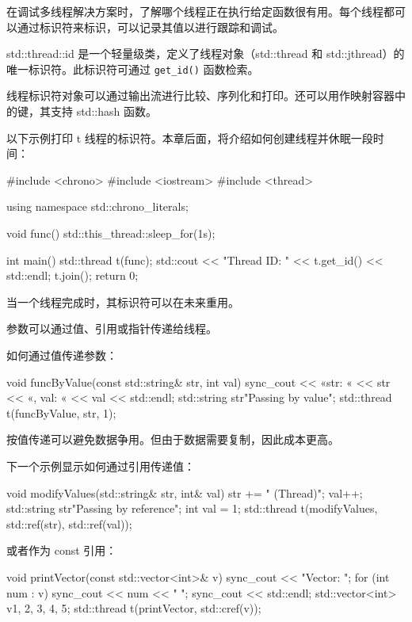 
在调试多线程解决方案时，了解哪个线程正在执行给定函数很有用。每个线程都可以通过标识符来标识，可以记录其值以进行跟踪和调试。

std::thread::id 是一个轻量级类，定义了线程对象（std::thread 和 std::jthread）的唯一标识符。此标识符可通过 \verb|get_id()| 函数检索。

线程标识符对象可以通过输出流进行比较、序列化和打印。还可以用作映射容器中的键，其支持 std::hash 函数。

以下示例打印 t 线程的标识符。本章后面，将介绍如何创建线程并休眠一段时间：

\begin{cpp}
#include <chrono>
#include <iostream>
#include <thread>

using namespace std::chrono_literals;

void func() {
    std::this_thread::sleep_for(1s);
}

int main() {
    std::thread t(func);
    std::cout << "Thread ID: " << t.get_id() << std::endl;
    t.join();
    return 0;
}
\end{cpp}

当一个线程完成时，其标识符可以在未来重用。


参数可以通过值、引用或指针传递给线程。

如何通过值传递参数：

\begin{cpp}
void funcByValue(const std::string& str, int val) {
    sync_cout << «str: « << str << «, val: « << val
    << std::endl;
}
std::string str{"Passing by value"};
std::thread t(funcByValue, str, 1);
\end{cpp}

按值传递可以避免数据争用。但由于数据需要复制，因此成本更高。

下一个示例显示如何通过引用传递值：

\begin{cpp}
void modifyValues(std::string& str, int& val) {
    str += " (Thread)";
    val++;
}
std::string str{"Passing by reference"};
int val = 1;
std::thread t(modifyValues, std::ref(str), std::ref(val));
\end{cpp}

或者作为 const 引用：

\begin{cpp}
void printVector(const std::vector<int>& v) {
    sync_cout << "Vector: ";
    for (int num : v) {
        sync_cout << num << " ";
    }
    sync_cout << std::endl;
}
std::vector<int> v{1, 2, 3, 4, 5};
std::thread t(printVector, std::cref(v));
\end{cpp}

